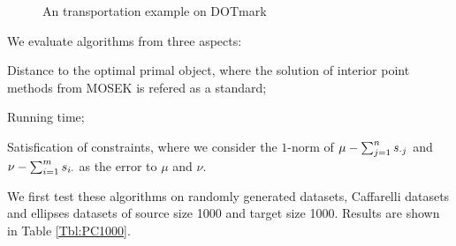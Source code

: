 \documentclass[english]{pkupaper}
\begin{document}
\begin{figure}
\centering
\scalebox{0.33}{} 
\hspace{-1cm}
\scalebox{0.33}{} 
\hspace{-1cm}
\scalebox{0.33}
{}
\caption{An transportation example on DOTmark} \label{Fig:DOTMark}
\end{figure}

We evaluate algorithms from three aspects:
\begin{partlist}
\item Distance to the optimal primal object, where the solution of interior point methods from MOSEK is refered as a standard;
\item Running time;
\item Satisfication of constraints, where we consider the $1$-norm of $ \mu - \sum_{ {j} = {1} }^{n}{s_{ \cdot j }} $ and $ \nu - \sum_{ {i} = {1} }^{m}{s_{ i \cdot }}$ as the error to $\mu$ and $\nu$.
\end{partlist}

We first test these algorithms on randomly generated datasets, Caffarelli datasets and ellipses datasets of source size 1000 and target size 1000. Results are shown in Table \ref{Tbl:PC1000}.
\end{document}
